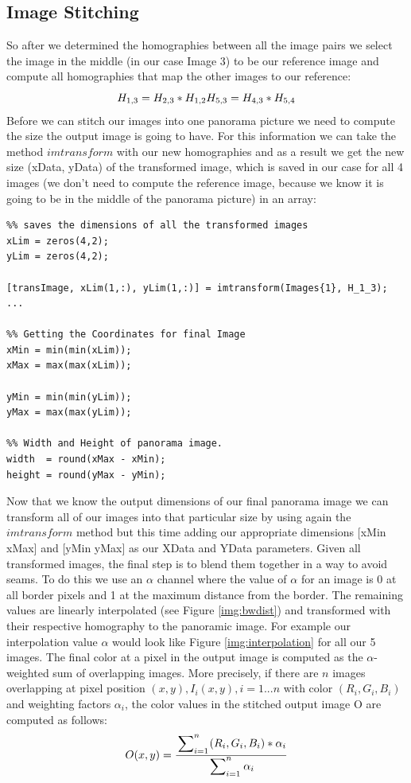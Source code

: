 \documentclass[subfigure,epsfig,fleqn,float,numbers=noenddot]{scrartcl}
\begin{document}
\subsection{Image Stitching}
\label{sec:C}
So after we determined the homographies between all the image pairs we select the image in the middle (in our case Image 3) to be our reference image and compute all homographies that map the other images to our reference:
\begin{equation*}
\\H_{1,3} = H_{2,3} * H_{1,2} \\
H_{5,3} = H_{4,3} * H_{5,4} 
\end{equation*}
Before we can stitch our images into one panorama picture we need to compute the size the output image is going to have. For this information we can take the method $imtransform$ with our new homographies and as a result we get the new size (xData, yData) of the transformed image, which is saved in our case for all 4 images (we don't need to compute the reference image, because we know it is going to be in the middle of the panorama picture) in an array: 
\begin{lstlisting}
%% saves the dimensions of all the transformed images
xLim = zeros(4,2);
yLim = zeros(4,2);
	
[transImage, xLim(1,:), yLim(1,:)] = imtransform(Images{1}, H_1_3);
...
	
%% Getting the Coordinates for final Image
xMin = min(min(xLim));
xMax = max(max(xLim));
   
yMin = min(min(yLim));
yMax = max(max(yLim));
   
%% Width and Height of panorama image.
width  = round(xMax - xMin);	
height = round(yMax - yMin);
\end{lstlisting}

Now that we know the output dimensions of our final panorama image we can transform all of our images into that particular size by using again the $imtransform$ method but this time adding our appropriate dimensions [xMin xMax] and [yMin yMax] as our XData and YData parameters. Given all transformed images, the final step is to blend them together in a way to avoid seams. To do this we use an $\alpha$ channel where the value of $\alpha$ for an image is 0 at all border pixels and 1 at the maximum distance from the border. The remaining values are linearly interpolated (see Figure \ref{img:bwdist}) and transformed with their respective homography to the panoramic image. For example our interpolation value $\alpha$ would look like Figure \ref{img:interpolation} for all our 5 images. The final color at a pixel in the output image is computed as the $\alpha$-weighted sum of overlapping images. More precisely, if there are $n$ images overlapping at pixel position $(x,y), I_i(x,y), i = 1...n$ with color $(R_i,G_i,B_i)$ and weighting factors $\alpha_i$, the color values in the stitched output image O are computed as follows:
\begin{equation*}
	O(x,y) = \frac{\sideset{}{_{i=1}^n}\sum_{} (R_i,G_i,B_i) * \alpha_i} {\sideset{}{_{i=1}^n}\sum_{} \alpha_i}
\end{equation*}
\end{document}
